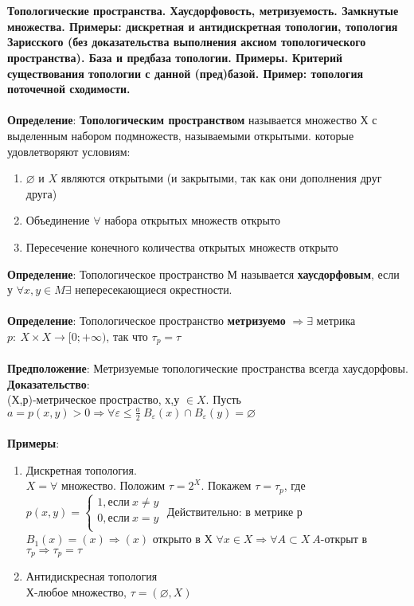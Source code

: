 	
\newpage
\section{}
	\textbf{Топологические пространства. Хаусдорфовость, метризуемость. Замкнутые множества. Примеры: дискретная и антидискретная топологии, топология Зарисского (без доказательства выполнения аксиом топологического пространства). База и предбаза топологии. Примеры. Критерий существования топологии с данной (пред)базой. Пример: топология поточечной сходимости.}\\
	\\
	\textbf{Определение}: \textbf{Топологическим пространством} называется множество Х с выделенным набором подмножеств, называемыми открытыми. которые удовлетворяют условиям:
	\begin{enumerate}
		\item $\varnothing$ и $X$ являются открытыми (и закрытыми, так как они дополнения друг друга)
		\item Объединение $\forall$ набора открытых множеств открыто
		\item Пересечение конечного количества открытых множеств открыто
	\end{enumerate}
	\textbf{Определение}: Топологическое пространство М называется \textbf{хаусдорфовым}, если у $\forall x,y \in M \exists$ непересекающиеся окрестности.\\
	\\
	\textbf{Определение}: Топологическое пространство \textbf{метризуемо} $\Rightarrow \exists$ метрика $p:\ X \times X \rightarrow [0;+ \infty)$, так что $\tau_p = \tau$\\
	\\
	\textbf{Предположение}: Метризуемые топологические пространства всегда хаусдорфовы.\\
	\textbf{Доказательство}:\\
	(Х,р)-метрическое простраство, х,у $\in X$. Пусть $a = p(x,y)>0 \Rightarrow \forall \varepsilon \leqslant \frac{a}{2}\ B_{\varepsilon}(x) \cap B_{\varepsilon}(y)=\varnothing$\\
	\\
	\textbf{Примеры}:
	\begin{enumerate}
		\item
		Дискретная топология.\\
		$X = \forall $ множество. Положим $\tau = 2^X$. 
		Покажем $\tau = \tau_p$, где 
		$p(x,y) = 
		\begin{cases}
		1, \text{если}\ x\neq y\\
		0, \text{если}\ x = y\\
		\end{cases}$
		Действительно: в метрике р $B_1(x) = (x) \Rightarrow (x)$ открыто в Х $\forall x \in X \Rightarrow \forall A \subset X\ A$-открыт в $\tau_p \Rightarrow \tau_p = \tau$
		
		\item
		Антидискресная топология\\
		Х-любое множество, $\tau = (\varnothing, X)$\\
	\end{enumerate}
